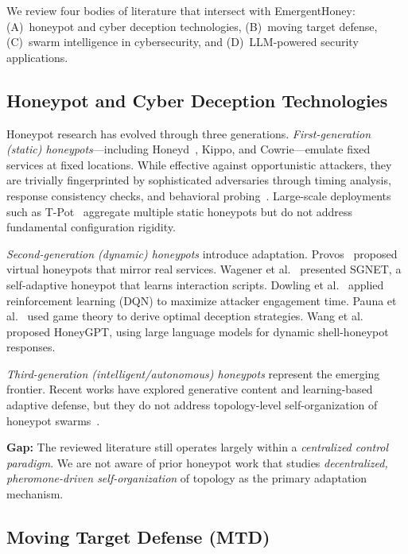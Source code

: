 \documentclass[review,3p,twocolumn]{elsarticle}
\begin{document}
We review four bodies of literature that intersect with EmergentHoney: (A)~honeypot and cyber deception technologies, (B)~moving target defense, (C)~swarm intelligence in cybersecurity, and (D)~LLM-powered security applications.

\subsection{Honeypot and Cyber Deception Technologies}

Honeypot research has evolved through three generations. \emph{First-generation (static) honeypots}---including Honeyd~\cite{provos2003honeyd}, Kippo, and Cowrie---emulate fixed services at fixed locations. While effective against opportunistic attackers, they are trivially fingerprinted by sophisticated adversaries through timing analysis, response consistency checks, and behavioral probing~\cite{vetterl2020counting}. Large-scale deployments such as T-Pot~\cite{tpot2023} aggregate multiple static honeypots but do not address fundamental configuration rigidity.

\emph{Second-generation (dynamic) honeypots} introduce adaptation. Provos~\cite{provos2004virtual} proposed virtual honeypots that mirror real services. Wagener et al.~\cite{wagener2009self} presented SGNET, a self-adaptive honeypot that learns interaction scripts. Dowling et al.~\cite{dowling2019using} applied reinforcement learning (DQN) to maximize attacker engagement time. Pauna et al.~\cite{pauna2018game} used game theory to derive optimal deception strategies. Wang et al.~\cite{sun2024honeygpt} proposed HoneyGPT, using large language models for dynamic shell-honeypot responses.

\emph{Third-generation (intelligent/autonomous) honeypots} represent the emerging frontier. Recent works have explored generative content and learning-based adaptive defense, but they do not address topology-level self-organization of honeypot swarms~\cite{huang2020adaptive}.

\textbf{Gap:} The reviewed literature still operates largely within a \emph{centralized control paradigm}. We are not aware of prior honeypot work that studies \emph{decentralized, pheromone-driven self-organization} of topology as the primary adaptation mechanism.

\subsection{Moving Target Defense (MTD)}
\end{document}
